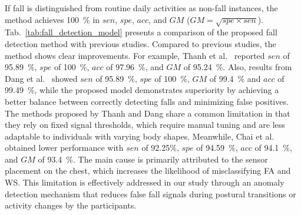 \documentclass[journal,twoside,web]{ieeecolor}
\begin{document}
If fall is distinguished from routine daily activities as non-fall instances, the method achieves 100~\% in $sen$, $spe$, $acc$, and $GM$ ($GM = \sqrt{{spe} \times sen}$). Tab.~\ref{tab:fall_detection_model} presents a comparison of the proposed fall detection method with previous studies. Compared to previous studies, the method shows clear improvements. For example, Thanh et al.~\cite{Thanhfire2019} reported $sen$ of 95.89~\%, $spe$ of 100~\%, $acc$ of 97.96~\%, and $GM$ of 95.24~\%. Also, results from Dang et al.~\cite{Dang2022} showed $sen$ of 95.89~\%, $spe$ of 100~\%, $GM$ of 99.4~\%  and $acc$ of 99.49~\%, while the proposed model demonstrates superiority by achieving a better balance between correctly detecting falls and minimizing false positives. The methods proposed by Thanh and Dang share a common limitation in that they rely on fixed signal thresholds, which require manual tuning and are less adaptable to individuals with varying body shapes. Meanwhile, Chai et al.\cite{Chai2021} obtained lower performance with $sen$ of 92.25\%, $spe$ of 94.59~\%, $acc$ of 94.1~\%, and $GM$ of 93.4~\%. The main cause is primarily attributed to the sensor placement on the chest, which increases the likelihood of misclassifying FA and WS. This limitation is effectively addressed in our study through an anomaly detection mechanism that reduces false fall signals during postural transitions or activity changes by the participants.
\end{document}
